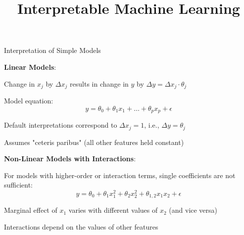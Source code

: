 \documentclass[10pt,compress,t,notes=noshow, xcolor=table]{beamer}
\title{Interpretable Machine Learning}
\begin{document}



\begin{framei}[align=top]{Interpretation of Simple Models}
\item \textbf{Linear Models}:
\begin{itemizeS}
\item Change in $x_j$ by $\Delta x_j$ results in change in $y$ by $\Delta y = \Delta x_j \cdot \theta_j$
\item Model equation:
$$
y = \theta_0 + \theta_1 x_1 + \dots + \theta_p x_p + \epsilon
$$
\item Default interpretations correspond to $\Delta x_j = 1$, i.e., $\Delta y = \theta_j$
\item Assumes "ceteris paribus" (all other features held constant)
\end{itemizeS}
\pause
\item \textbf{Non-Linear Models with Interactions}:
\begin{itemizeS}
\item For models with higher-order or interaction terms, single coefficients are not sufficient:
$$
y = \theta_0 + \theta_{1} x_1^2 + \theta_{2} x_2^2 + \theta_{1,2} x_1 x_2 + \epsilon
$$
\item Marginal effect of $x_1$ varies with different values of $x_2$ (and vice versa)
\item Interactions depend on the values of other features
\end{itemizeS}
\end{framei}

\end{document}

